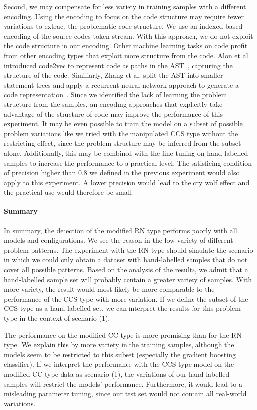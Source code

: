 Second, we may compensate for less variety in training samples with a different encoding. Using the encoding to focus on the code structure may require fewer variations to extract the problematic code structure. We use an indexed-based encoding of the source codes token stream. With this approach, we do not exploit the code structure in our encoding. Other machine learning tasks on code profit from other encoding types that exploit more structure from the code. Alon et al. introduced code2vec to represent code as paths in the AST~\cite{alon_code2vec_2018}, capturing the structure of the code. Similiarly, Zhang et al. split the AST into smaller statement trees and apply a recurrent neural network approach to generate a code representation~\cite{zhang_novel_2019}.
Since we identified the lack of learning the problem structure from the samples, an encoding approaches that explicitly take advantage of the structure of code may improve the performance of this experiment. It may be even possible to train the model on a subset of possible problem variations like we tried with the manipulated CCS type without the restricting effect, since the problem structure may be inferred from the subset alone.
Additionally, this may be combined with the fine-tuning on hand-labelled samples to increase the performance to a practical level. The satisficing condition of precision higher than 0.8 we defined in the previous experiment would also apply to this experiment. A lower precision would lead to the cry wolf effect and the practical use would therefore be small.

\paragraph{Summary}
In summary, the detection of the modified RN type performs poorly with all models and configurations. We see the reason in the low variety of different problem patterns. The experiment with the RN type should simulate the scenario in which we could only obtain a dataset with hand-labelled samples that do not cover all possible patterns. Based on the analysis of the results, we admit that a hand-labelled sample set will probably contain a greater variety of samples. With more variety, the result would most likely be more comparable to the performance of the CCS type with more variation. If we define the subset of the CCS type as a hand-labelled set, we can interpret the results for this problem type in the context of scenario (1). 

The performance on the modified CC type is more promising than for the RN type. We explain this by more variety in the training samples, although the models seem to be restricted to this subset (especially the gradient boosting classifier). If we interpret the performance with the CCS type model on the modified CC type data as scenario (1), the variations of our hand-labelled samples will restrict the models' performance. Furthermore, it would lead to a misleading parameter tuning, since our test set would not contain all real-world variations.

